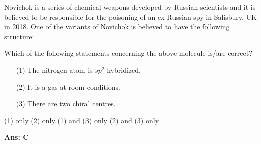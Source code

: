 \documentclass[border=3pt,varwidth=70mm]{standalone}
\begin{document}
Novichok is a series of chemical weapons developed by Russian scientists and it is believed to be responsible for the poisoning of an ex-Russian spy in Salisbury, UK in 2018. One of the variants of Novichok is believed to have the following structure:
\begin{center}
\end{center}
Which of the following statements concerning the above molecule is/are correct?
\begin{itemize}
\item[(1)] The nitrogen atom is $sp^2$-hybridized.
\item[(2)] It is a gas at room conditions.
\item[(3)] There are two chiral centres.
\end{itemize}

\begin{choices}
\choice (1) only
\choice (2) only
\choice (1) and (3) only
\choice (2) and (3) only
\end{choices}

\begin{answer}
\hrulefill\par
\textbf{Ans: C}


\end{answer}
\end{document}
